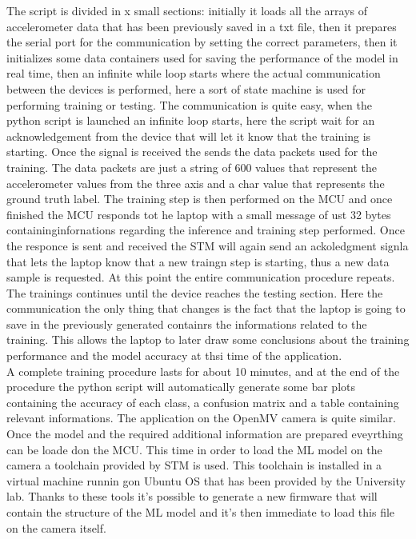 \documentclass[12pt]{report}
\begin{document}
The script is divided in x small sections: initially it loads all the arrays of accelerometer data that has been previously saved in a txt file, then it prepares the serial port for the communication by setting the correct parameters, then it initializes some data containers used for saving the performance of the model in real time, then an infinite while loop starts where the actual communication between the devices is performed, here a sort of state machine is used for performing training or testing. 
The communication is quite easy, when the python script is launched an infinite loop starts, here the script wait for an acknowledgement from the device that will let it know that the training is starting. Once the signal is received the sends the data packets used for the training. The data packets are just a string of 600 values that represent the accelerometer values from the three axis and a char value that represents the ground truth label. The training step is then performed on the MCU and once finished the MCU responds tot he laptop with a small message of ust 32 bytes containinginfornations regarding the inference and training step performed. Once the responce is sent and received the STM will again send an ackoledgment signla that lets the laptop know that a new traingn step is starting, thus a new data sample is requested. At this point the entire communication procedure repeats. 
The trainings continues until the device reaches the testing section. Here the communication the only thing that changes is the fact that the laptop is going to save in the previously generated containrs the informations related to the training. This allows the laptop to later draw some conclusions about the training performance and the model accuracy at thsi time of the application. \\
A complete training procedure lasts for about 10 minutes, and at the end of the procedure the python script will automatically generate some bar plots containing the accuracy of each class, a confusion matrix and a table containing relevant informations. \bigskip
The application on the OpenMV camera is quite similar. Once the model and the required additional information are prepared eveyrthing can be loade don the MCU. This time in order to load the ML model on the camera a toolchain provided by STM is used. This toolchain is installed in a virtual machine runnin gon Ubuntu OS that has been provided by the University lab. Thanks to these tools it's possible to generate a new firmware that will contain the structure of the ML model and it's then immediate to load this file on the camera itself.  \\
\end{document}

